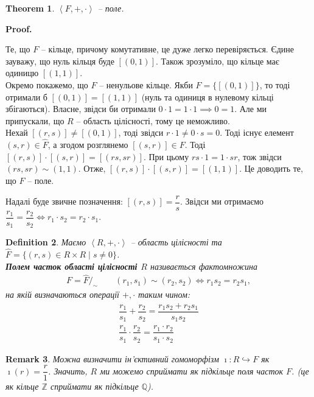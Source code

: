 \documentclass[a4paper, 10pt]{article}
\makeatletter
\theoremstyle{theoremdd}
\newtheorem{theorem}{Theorem}[subsection]
\theoremstyle{theoremdd}
\newtheorem{definition}[theorem]{Definition}
\theoremstyle{theoremdd}
\theoremstyle{theoremdd}
\theoremstyle{theoremdd}
\theoremstyle{theoremdd}
\theoremstyle{theoremdd}
\theoremstyle{theoremdd}
\theoremstyle{theoremdd}
\theoremstyle{theoremdd}
\theoremstyle{theoremdd}
\newtheorem{remark}[theorem]{Remark}
\theoremstyle{theoremdd}
\theoremstyle{theoremdd}
\theoremstyle{theoremdd}
\theoremstyle{theoremdd}
\renewenvironment{proof}[1][Proof.\\]{\par
\pushQED{\hfill \qed}%
\normalfont \topsep6\p@\@plus6\p@\relax
\trivlist
\item\relax
{\bfseries
#1\@addpunct{.}}\hspace\labelsep\ignorespaces
}{%
\popQED\endtrivlist\@endpefalse
}
\makeatother
\begin{document}
\begin{theorem}
$\left< F, +, \cdot \right>$ -- поле.
\end{theorem}

\begin{proof}
Те, що $F$ -- кільце, причому комутативне, це дуже легко перевіряється. Єдине зауважу, що нуль кільця буде $[(0,1)]$. Також зрозуміло, що кільце має одиницю $[(1,1)]$.\\
Окремо покажемо, що $F$ -- ненульове кільце. Якби $F = \{ [(0,1)]\}$, то тоді отримали б $[(0,1)] = [(1,1)]$ (нуль та одиниця в нулевому кільці збігаються). Власне, звідси би отримали $0 \cdot 1 = 1 \cdot 1 \implies 0 = 1$. Але ми припускали, що $R$ -- область цілісності, тому це неможливо.\\
Нехай $[(r,s)] \neq [(0,1)]$, тоді звідси $r \cdot 1 \neq 0 \cdot s = 0$. Тоді існує елемент $(s,r) \in \hat{F}$, а згодом розглянемо $[(s,r)] \in F$. Тоді $[(r,s)] \cdot [(s,r)] = [(rs,sr)]$. При цьому $rs \cdot 1 = 1 \cdot sr$, тож звідси $(rs,sr) \sim (1,1)$. Отже, $[(r,s)] \cdot [(s,r)] = [(1,1)]$. Це доводить те, що $F$ -- поле.
\end{proof}

Надалі буде звичне позначення: $[(r,s)] = \dfrac{r}{s}$. Звідси ми отримаємо $\dfrac{r_1}{s_1} = \dfrac{r_2}{s_2} \iff r_1 \cdot s_2 = r_2 \cdot s_1$.

\begin{definition}
Маємо $\left<R,+,\cdot\right>$ -- область цілісності та $\hat{F} = \{ (r,s) \in R \times R \mid s \neq 0 \}$.\\
\textbf{Полем часток області цілісності $R$} називається фактомножина
\begin{align*}
F = \hat{F}/_\sim \qquad (r_1,s_1) \sim (r_2,s_2) \iff r_1 s_2 = r_2 s_1,
\end{align*}
на якій визначаються операції $+,\cdot$ таким чином:
\begin{align*}
\dfrac{r_1}{s_1} + \dfrac{r_2}{s_2} = \dfrac{r_1 s_2 + r_2 s_1}{s_1 s_2} \\
\dfrac{r_1}{s_1} \cdot \dfrac{r_2}{s_2} = \dfrac{r_1 \cdot r_2}{s_1 \cdot s_2}
\end{align*}
\end{definition}

\begin{remark}
Можна визначити ін'єктивний гомоморфізм $\imath \colon R \hookrightarrow F$ як $\imath(r) = \dfrac{r}{1}$. Значить, $R$ ми можемо сприймати як підкільце поля часток $F$. (це як кільце $\mathbb{Z}$ сприймати як підкільце $\mathbb{Q}$).
\end{remark}
\end{document}
